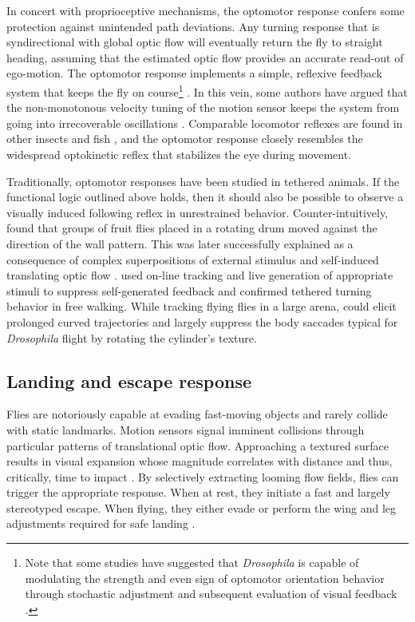 In concert with proprioceptive mechanisms, the optomotor response confers some protection against unintended path deviations. Any turning response that is syndirectional with global optic flow will eventually return the fly to straight heading, assuming that the estimated optic flow provides an accurate read-out of ego-motion. The optomotor response implements a simple, reflexive feedback system that keeps the fly on course\footnote{Note that some studies have suggested that \textit{Drosophila} is capable of modulating the strength and even sign of optomotor orientation behavior through stochastic adjustment and subsequent evaluation of visual feedback \citep{Wolf:1992aa,Wolf:1986ii}.} \citep{Borst:2014kl}. In this vein, some authors have argued that the non-monotonous velocity tuning of the motion sensor keeps the system from going into irrecoverable oscillations \citep{Warzecha:1996bm}. Comparable locomotor reflexes are found in other insects and fish \citep{Arnold:1974aa,Portugues:2014aa}, and the optomotor response closely resembles the widespread optokinetic reflex that stabilizes the eye during movement.


Traditionally, optomotor responses have been studied in tethered animals. If the functional logic outlined above holds, then it should also be possible to observe a visually induced following reflex in unrestrained behavior. Counter-intuitively, \citet{Goetz:1970aa} found that groups of fruit flies placed in a rotating drum moved against the direction of the wall pattern. This was later successfully explained as a consequence of complex superpositions of external stimulus and self-induced translating optic flow \citep{Goetz:1975aa}. \citet{Strauss:1997ut} used on-line tracking and live generation of appropriate stimuli to suppress self-generated feedback and confirmed tethered turning behavior in free walking. While tracking flying flies in a large arena, \citet{Mronz:2008eb} could elicit prolonged curved trajectories and largely suppress the body saccades typical for \textit{Drosophila} flight by rotating the cylinder's texture.


\subsection{Landing and escape response}
Flies are notoriously capable at evading fast-moving objects and rarely collide with static landmarks. Motion sensors signal imminent collisions through particular patterns of translational optic flow. Approaching a textured surface results in visual expansion whose magnitude correlates with distance and thus, critically, time to impact \citep{Koenderink:1986um}. By selectively extracting looming flow fields, flies can trigger the appropriate response. When at rest, they initiate a fast and largely stereotyped escape. When flying, they either evade or perform the wing and leg adjustments required for safe landing \citep{Borst:2014kl}.

